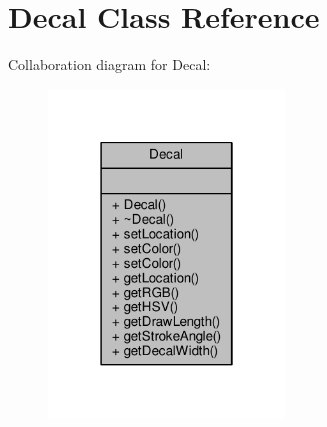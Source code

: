 \hypertarget{classDecal}{}\section{Decal Class Reference}
\label{classDecal}


Collaboration diagram for Decal\+:
\nopagebreak
\begin{figure}[H]
\begin{center}
\leavevmode
\includegraphics[width=178pt]{classDecal__coll__graph}
\end{center}
\end{figure}

